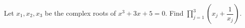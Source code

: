 Let $x_1,x_2,x_3$ be the complex roots of $x^3+3x+5=0$. Find $\prod_{j=1}^3\left(x_j+\dfrac{1}{x_j}\right)$.
